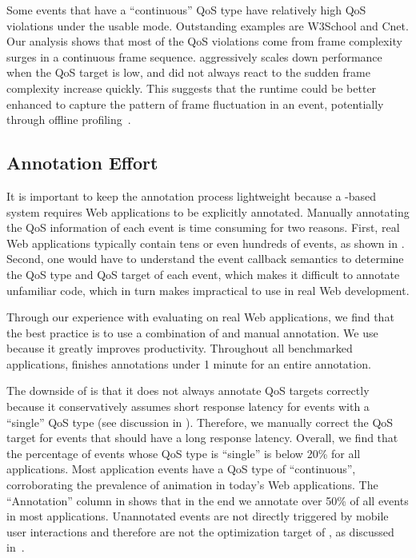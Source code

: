 Some events that have a ``continuous'' QoS type have relatively high QoS violations under the usable mode. Outstanding examples are \textsf{W3School} and \textsf{Cnet}. Our analysis shows that most of the QoS violations come from frame complexity surges in a continuous frame sequence. \greenweb aggressively scales down performance when the QoS target is low, and did not always react to the sudden frame complexity increase quickly. This suggests that the \greenweb runtime could be better enhanced to capture the pattern of frame fluctuation in an event, potentially through offline profiling~\cite{pgdvfs}.

\subsection{Annotation Effort}
\label{sec:lang:eval:annotate}

It is important to keep the annotation process lightweight  because a \greenweb-based system requires Web applications to be explicitly annotated. Manually annotating the QoS information of each event is time consuming for two reasons. First, real Web applications typically contain tens or even hundreds of events, as shown in . Second, one would have to understand the event callback semantics to determine the QoS type and QoS target of each event, which makes it difficult to annotate unfamiliar code, which in turn makes \greenweb impractical to use in real Web development.

Through our experience with evaluating \greenweb on real Web applications, we find that the best practice is to use a combination of \autogreen and manual annotation. We use \autogreen because it greatly improves productivity. Throughout all benchmarked applications, \autogreen finishes annotations under 1 minute for an entire annotation.

The downside of \autogreen is that it does not always annotate QoS targets correctly because it conservatively assumes short response latency for events with a ``single'' QoS type (see discussion in ). Therefore, we manually correct the QoS target for events that should have a long response latency. Overall, we find that the percentage of events whose QoS type is ``single'' is below 20\% for all applications. Most application events have a QoS type of ``continuous'', corroborating the prevalence of animation in today's Web applications. The ``Annotation'' column in  shows that in the end we annotate over 50\% of all events in most applications. Unannotated events are not directly triggered by mobile user interactions and therefore are not the optimization target of \greenweb, as discussed in~.

